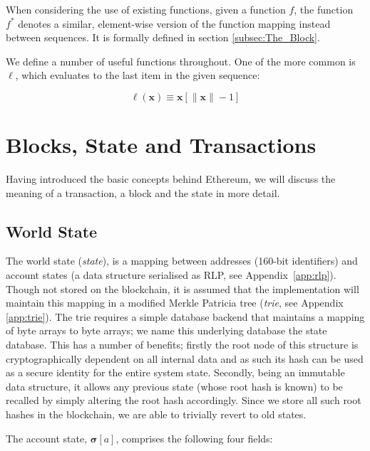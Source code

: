 \documentclass[9pt,oneside]{amsart}
\makeatletter
\newcommand{\linkdest}[1]{\Hy@raisedlink{\hypertarget{#1}{}}}
\makeatother
\begin{document}
\begin{multicols}{2}
When considering the use of existing functions, given a function $f$, the function \hyperlink{general_element_wise_sequence_transformation_f_pow_asterisk}{$f^*$} denotes a similar, element-wise version of the function mapping instead between sequences. It is formally defined in section \hyperlink{block}{\ref{subsec:The_Block}}.

We define a number of useful functions throughout. \linkdest{ell}One of the more common is $\ell$, which evaluates to the last item in the given sequence:

\begin{equation}
\ell(\mathbf{x}) \equiv \mathbf{x}[\lVert \mathbf{x} \rVert - 1]
\end{equation}

\section{Blocks, State and Transactions} \label{ch:bst}

Having introduced the basic concepts behind Ethereum, we will discuss the meaning of a transaction, a block and the state in more detail.

\subsection{World State} \label{ch:state}

The world state (\textit{state}), is a mapping between addresses (160-bit identifiers) and account states (a data structure serialised as RLP, see Appendix~\ref{app:rlp}). Though not stored on the blockchain, it is assumed that the implementation will maintain this mapping in a modified Merkle Patricia tree (\textit{trie}, see Appendix \ref{app:trie}). The trie requires a simple database backend that maintains a mapping of byte arrays to byte arrays; we name this underlying database the state database. This has a number of benefits; firstly the root node of this structure is cryptographically dependent on all internal data and as such its hash can be used as a secure identity for the entire system state. Secondly, being an immutable data structure, it allows any previous state (whose root hash is known) to be recalled by simply altering the root hash accordingly. Since we store all such root hashes in the blockchain, we are able to trivially revert to old states.

The account state, $\boldsymbol{\sigma}[a]$, comprises the following four fields:


\end{multicols}
\end{document}

